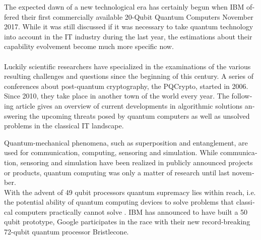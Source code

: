 \documentclass[a4paper,11pt]{article}
\begin{document}
\begin{otherlanguage}{english}

\vspace{3mm}
\begin{multicols}{2}
\noindent


The expected dawn of a new technological era has certainly begun when IBM offered their first commercially available 20-Qubit Quantum Computers November 2017.
While it was still discussed if it was necessary to take quantum technology into account in the IT industry during the last year, the estimations about their capability evolvement become much more specific now.\\ \\
Luckily scientific researchers have specialized in the examinations of the various resulting challenges and questions since the beginning of this century. A series of conferences about post-quantum cryptography, the PQCrypto, started in 2006. Since 2010, they take place in another town of the world every year. The following article gives an overview of current developments in algorithmic solutions answering the upcoming threats posed by quantum computers as well as unsolved problems in the classical IT landscape. 

Quantum-mechanical phenomena, such as superposition and entanglement, are used for communication, computing, sensoring and simulation. While communication, sensoring and simulation have been realized in publicly announced projects or products, quantum computing was only a matter of research until last november. \\
With the advent of 49 qubit processors quantum supremacy lies within reach, i.e. the potential ability of quantum computing devices to solve problems that classical computers practically cannot solve \cite{IEEESpec, googleai}. IBM has announced to have built a 50 qubit prototype, Google participates in the race with their new record-breaking 72-qubit quantum processor Bristlecone.


\end{multicols}
\end{otherlanguage}
\end{document}
